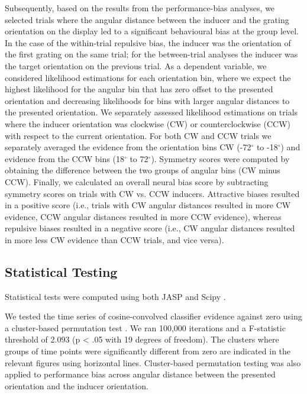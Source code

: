 \documentclass{article}
\begin{document}
Subsequently, based on the results from the performance-bias analyses, we selected trials where the angular distance between the inducer and the grating orientation on the display led to a significant behavioural bias at the group level. In the case of the within-trial repulsive bias, the inducer was the orientation of the first grating on the same trial; for the between-trial analyses the inducer was the target orientation on the previous trial. As a dependent variable, we considered likelihood estimations for each orientation bin, where we expect the highest likelihood for the angular bin that has zero offset to the presented orientation and decreasing likelihoods for bins with larger angular distances to the presented orientation. We separately assessed likelihood estimations on trials where the inducer orientation was clockwise (CW) or counterclockwise (CCW) with respect to the current orientation. For both CW and CCW trials we separately averaged the evidence from the orientation bins CW (-72$^{\circ}$ to -18$^{\circ}$) and evidence from the CCW bins (18$^{\circ}$ to 72$^{\circ}$). Symmetry scores were computed by obtaining the difference between the two groups of angular bins (CW minus CCW). Finally, we calculated an overall neural bias score by subtracting symmetry scores on trials with CW vs. CCW inducers. Attractive biases resulted in a positive score (i.e., trials with CW angular distances resulted in more CW evidence, CCW angular distances resulted in more CCW evidence), whereas repulsive biases resulted in a negative score (i.e., CW angular distances resulted in more less CW evidence than CCW trials, and vice versa). 

\subsection{Statistical Testing}
Statistical tests were computed using both JASP \parencite{JASP2020} and Scipy \parencite{Virtanen2020}. 

We tested the time series of cosine-convolved classifier evidence against zero using a cluster-based permutation test \parencite[using MNE; ][]{Gramfort2013}. We ran 100,000 iterations and a F-statistic threshold of 2.093 (p < .05 with 19 degrees of freedom). The clusters where groups of time points were significantly different from zero are indicated in the relevant figures using horizontal lines. Cluster-based permutation testing was also applied to performance bias across angular distance between the presented orientation and the inducer orientation.
\end{document}

